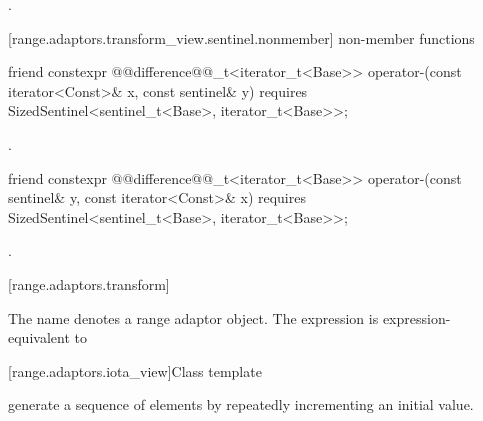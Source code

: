\begin{itemdescr}
\pnum
\returns {}.
\end{itemdescr}

[range.adaptors.transform_view.sentinel.nonmember]{ non-member functions}

%
\begin{itemdecl}
friend constexpr @@difference@@_t<iterator_t<Base>>
operator-(const iterator<Const>& x, const sentinel& y)
  requires SizedSentinel<sentinel_t<Base>, iterator_t<Base>>;
\end{itemdecl}

\begin{itemdescr}
\pnum
\returns {}.
\end{itemdescr}

%
\begin{itemdecl}
friend constexpr @@difference@@_t<iterator_t<Base>>
operator-(const sentinel& y, const iterator<Const>& x)
  requires SizedSentinel<sentinel_t<Base>, iterator_t<Base>>;
\end{itemdecl}

\begin{itemdescr}
\pnum
\returns {}.
\end{itemdescr}

[range.adaptors.transform]{}

\pnum
The name  denotes a range adaptor
object.  The expression   is expression-equivalent to
 


[range.adaptors.iota_view]{Class template }

\pnum
{}   generate a
sequence of elements by repeatedly incrementing an initial value.

